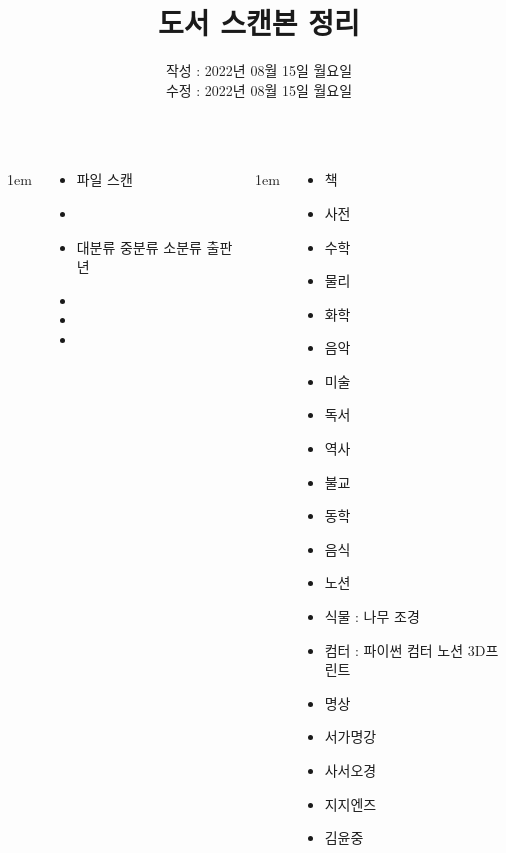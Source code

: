 \documentclass[	20pt, 
							a1paper, 
							portrait, %
							margin=0mm, %
							innermargin=10mm,  		%
							colspace=5mm, 
							subcolspace=0mm
							]{tikzposter}
\title{도서 스캔본 정리}
\author{ 	작성 : 2022년 08월 15일 월요일 \\
			수정 : 2022년 08월 15일 월요일 }
\begin{document}
	\maketitle

	\begin{columns}


			{
					\setlength{\leftmargini}{4em}
					\setlength{\labelsep} {1em}
				\begin{LARGE}
					\begin{itemize}
					\item 	파일 스캔
					\item 	
					\item 	대분류  중분류 소분류  출판년 
					\item 	
					\item 	
					\item 	
					\end{itemize}
				\end{LARGE}
			}

			{
					\setlength{\leftmargini}{4em}
					\setlength{\labelsep} {1em}
				\begin{LARGE}
					\begin{itemize}
					\item 	책

					\item 	사전

					\item 	수학
					\item 	물리
					\item 	화학

					\item 	음악
					\item 	미술

					\item 	독서

					\item 	역사
					\item 	불교
					\item 	동학

					\item 	음식
					\item 	노션
					\item 	식물 : 나무  조경
					\item 	컴터 : 파이썬  컴터 노션 3D프린트
					\item 	명상
					\item 	서가명강
					\item 	사서오경
					\item 	지지엔즈
					\item 	김윤중


\end{itemize}
\end{LARGE}}
\end{columns}
\end{document}
